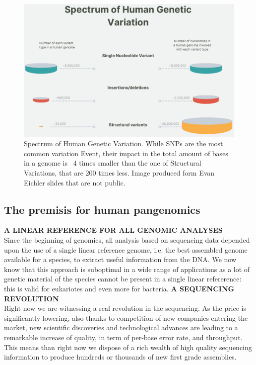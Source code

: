 \begin{figure}[h!]
	\centering
	\includegraphics[width=.95\linewidth]{figures/background/spectrum_var.png}
	\caption[Spectrum of Human Genetic Variation.]{Spectrum of Human Genetic Variation. While SNPs are the most common variation Event, their impact in the total amount of bases in a genome is ~4 times smaller than the one of Structural Variations, that are 200 times less. Image produced form Evan Eichler slides that are not public.}
	\label{fig:variation_spectrum}
\end{figure}

\subsection*{The premisis for human pangenomics}
\large{\textbf{A LINEAR REFERENCE FOR ALL GENOMIC ANALYSES}}\\
Since the beginning of genomics, all analysis based on sequencing data depended upon the use of a single linear reference genome, i.e. the best assembled genome available for a species, to extract useful information from the DNA. We now know that this approach is suboptimal in a wide range of applications as a lot of genetic material of the species cannot be present in a single linear refererence: this is valid for eukariotes and even more for bacteria.  
\huge{\textbf{A SEQUENCING REVOLUTION}}\\
Right now we are witnessing a real revolution in the sequencing. As the price is significantly lowering, also thanks to competition of new companies entering the market, new scientific discoveries and technological advances are leading to a remarkable increase of quality, in term of per-base error rate, and throughput. This means than right now we dispose of a rich wealth of high quality sequencing information to produce hundreds or thousands of new first grade assemblies.

